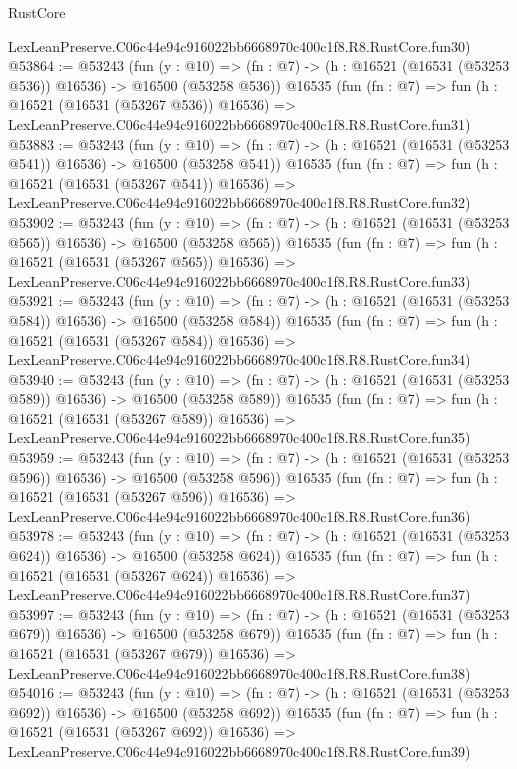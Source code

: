 \begin{lexlean}{RustCore}
\begin{coremodule}
    LexLeanPreserve.C06c44e94c916022bb6668970c400c1f8.R8.RustCore.fun30)
@53864 := @53243
    (fun (y : @10) =>
    (fn : @7) -> (h : @16521 (@16531 (@53253 @536)) @16536) -> @16500 (@53258 @536))
    @16535
    (fun (fn : @7) =>
    fun (h : @16521 (@16531 (@53267 @536)) @16536) =>
    LexLeanPreserve.C06c44e94c916022bb6668970c400c1f8.R8.RustCore.fun31)
@53883 := @53243
    (fun (y : @10) =>
    (fn : @7) -> (h : @16521 (@16531 (@53253 @541)) @16536) -> @16500 (@53258 @541))
    @16535
    (fun (fn : @7) =>
    fun (h : @16521 (@16531 (@53267 @541)) @16536) =>
    LexLeanPreserve.C06c44e94c916022bb6668970c400c1f8.R8.RustCore.fun32)
@53902 := @53243
    (fun (y : @10) =>
    (fn : @7) -> (h : @16521 (@16531 (@53253 @565)) @16536) -> @16500 (@53258 @565))
    @16535
    (fun (fn : @7) =>
    fun (h : @16521 (@16531 (@53267 @565)) @16536) =>
    LexLeanPreserve.C06c44e94c916022bb6668970c400c1f8.R8.RustCore.fun33)
@53921 := @53243
    (fun (y : @10) =>
    (fn : @7) -> (h : @16521 (@16531 (@53253 @584)) @16536) -> @16500 (@53258 @584))
    @16535
    (fun (fn : @7) =>
    fun (h : @16521 (@16531 (@53267 @584)) @16536) =>
    LexLeanPreserve.C06c44e94c916022bb6668970c400c1f8.R8.RustCore.fun34)
@53940 := @53243
    (fun (y : @10) =>
    (fn : @7) -> (h : @16521 (@16531 (@53253 @589)) @16536) -> @16500 (@53258 @589))
    @16535
    (fun (fn : @7) =>
    fun (h : @16521 (@16531 (@53267 @589)) @16536) =>
    LexLeanPreserve.C06c44e94c916022bb6668970c400c1f8.R8.RustCore.fun35)
@53959 := @53243
    (fun (y : @10) =>
    (fn : @7) -> (h : @16521 (@16531 (@53253 @596)) @16536) -> @16500 (@53258 @596))
    @16535
    (fun (fn : @7) =>
    fun (h : @16521 (@16531 (@53267 @596)) @16536) =>
    LexLeanPreserve.C06c44e94c916022bb6668970c400c1f8.R8.RustCore.fun36)
@53978 := @53243
    (fun (y : @10) =>
    (fn : @7) -> (h : @16521 (@16531 (@53253 @624)) @16536) -> @16500 (@53258 @624))
    @16535
    (fun (fn : @7) =>
    fun (h : @16521 (@16531 (@53267 @624)) @16536) =>
    LexLeanPreserve.C06c44e94c916022bb6668970c400c1f8.R8.RustCore.fun37)
@53997 := @53243
    (fun (y : @10) =>
    (fn : @7) -> (h : @16521 (@16531 (@53253 @679)) @16536) -> @16500 (@53258 @679))
    @16535
    (fun (fn : @7) =>
    fun (h : @16521 (@16531 (@53267 @679)) @16536) =>
    LexLeanPreserve.C06c44e94c916022bb6668970c400c1f8.R8.RustCore.fun38)
@54016 := @53243
    (fun (y : @10) =>
    (fn : @7) -> (h : @16521 (@16531 (@53253 @692)) @16536) -> @16500 (@53258 @692))
    @16535
    (fun (fn : @7) =>
    fun (h : @16521 (@16531 (@53267 @692)) @16536) =>
    LexLeanPreserve.C06c44e94c916022bb6668970c400c1f8.R8.RustCore.fun39)

\end{coremodule}
\end{lexlean}
